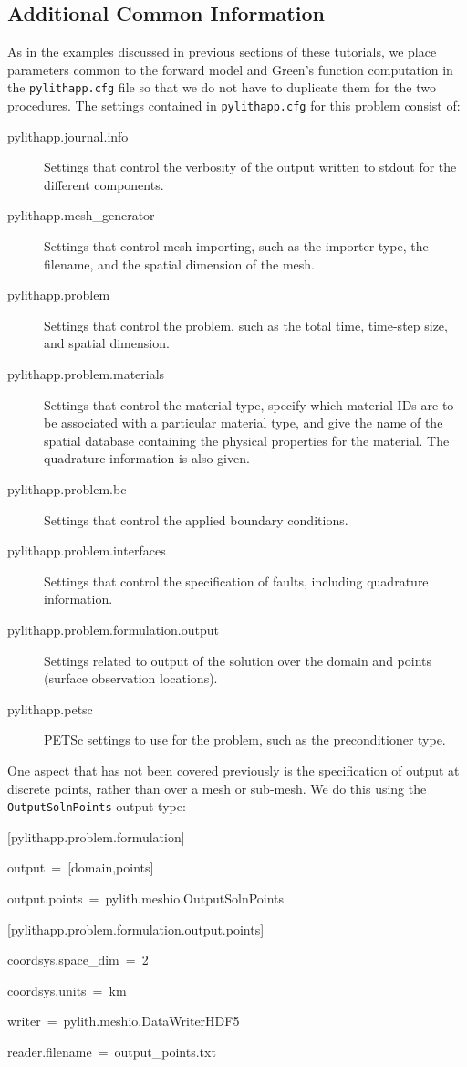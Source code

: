 \subsection{Additional Common Information}

As in the examples discussed in previous sections of these tutorials,
we place parameters common to the forward model and Green's function
computation in the \texttt{pylithapp.cfg} file so that we do not have
to duplicate them for the two procedures. The settings contained in
\texttt{pylithapp.cfg} for this problem consist of:
\begin{description}
\item [{pylithapp.journal.info}] Settings that control the verbosity of
the output written to stdout for the different components.
\item [{pylithapp.mesh\_generator}] Settings that control mesh importing,
such as the importer type, the filename, and the spatial dimension
of the mesh.
\item [{pylithapp.problem}] Settings that control the problem, such as
the total time, time-step size, and spatial dimension.
\item [{pylithapp.problem.materials}] Settings that control the material
type, specify which material IDs are to be associated with a particular
material type, and give the name of the spatial database containing
the physical properties for the material. The quadrature information
is also given.
\item [{pylithapp.problem.bc}] Settings that control the applied boundary
conditions.
\item [{pylithapp.problem.interfaces}] Settings that control the specification
of faults, including quadrature information.
\item [{pylithapp.problem.formulation.output}] Settings related to output
of the solution over the domain and points (surface observation locations).
\item [{pylithapp.petsc}] PETSc settings to use for the problem, such as
the preconditioner type.
\end{description}
One aspect that has not been covered previously is the specification
of output at discrete points, rather than over a mesh or sub-mesh.
We do this using the \texttt{OutputSolnPoints} output type:
\begin{lyxcode}
{[}pylithapp.problem.formulation{]}

output~=~{[}domain,points{]}

output.points~=~pylith.meshio.OutputSolnPoints



{[}pylithapp.problem.formulation.output.points{]}

coordsys.space\_dim~=~2

coordsys.units~=~km

writer~=~pylith.meshio.DataWriterHDF5

reader.filename~=~output\_points.txt
\end{lyxcode}
